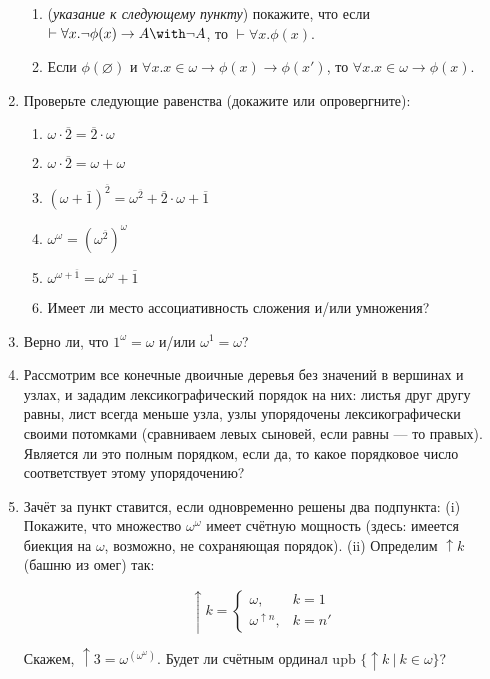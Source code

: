 \documentclass[10pt,a4paper,oneside]{article}
\begin{document}
\begin{enumerate}
\begin{enumerate}
\item (\emph{указание к следующему пункту}) покажите, что если $\vdash\forall x.\neg\phi(x)\rightarrow A\with\neg A$, то $\vdash\forall x.\phi(x)$.
\item Если $\phi(\varnothing)$ и $\forall x.x \in \omega \rightarrow \phi(x) \rightarrow \phi(x')$, 
то $\forall x.x \in \omega \rightarrow \phi(x)$.
\end{enumerate}
\item Проверьте следующие равенства (докажите или опровергните):
\begin{enumerate}
\item $\omega\cdot\overline{2} = \overline{2}\cdot\omega$
\item $\omega\cdot\overline{2} = \omega + \omega$
\item $(\omega+\overline{1})^{\overline{2}} = \omega^{\overline{2}} + \overline{2}\cdot \omega + \overline{1}$
\item $\omega ^ \omega = (\omega ^ {\overline{2}}) ^ \omega$
\item $\omega ^ {\omega + \overline{1}} = \omega ^ \omega + \overline{1}$
\item Имеет ли место ассоциативность сложения и/или умножения?
\end{enumerate}
\item Верно ли, что $1^\omega = \omega$ и/или $\omega^1 = \omega$?
\item Рассмотрим все конечные двоичные деревья без значений в вершинах и узлах, и зададим лексикографический порядок на них:
листья друг другу равны, лист всегда меньше узла, узлы упорядочены лексикографически своими потомками 
(сравниваем левых сыновей, если равны --- то правых). Является ли это полным порядком, если да, то какое порядковое число 
соответствует этому упорядочению?
\item Зачёт за пункт ставится, если одновременно решены два подпункта:
(i) Покажите, что множество $\omega^\omega$ имеет счётную мощность (здесь: имеется биекция на $\omega$, возможно, не 
сохраняющая порядок). 
(ii) Определим $\uparrow k$ (башню из омег) так:

$$\uparrow k = \left\{\begin{array}{ll}\omega,&k = 1\\\omega^{\uparrow n},&k = n'\end{array}\right.$$

Скажем, $\uparrow 3 = \omega^{\left(\omega^\omega\right)}$. Будет ли счётным ординал $\text{upb }\{\uparrow k\ |\ k \in \omega\}$?


\end{enumerate}
\end{document}
